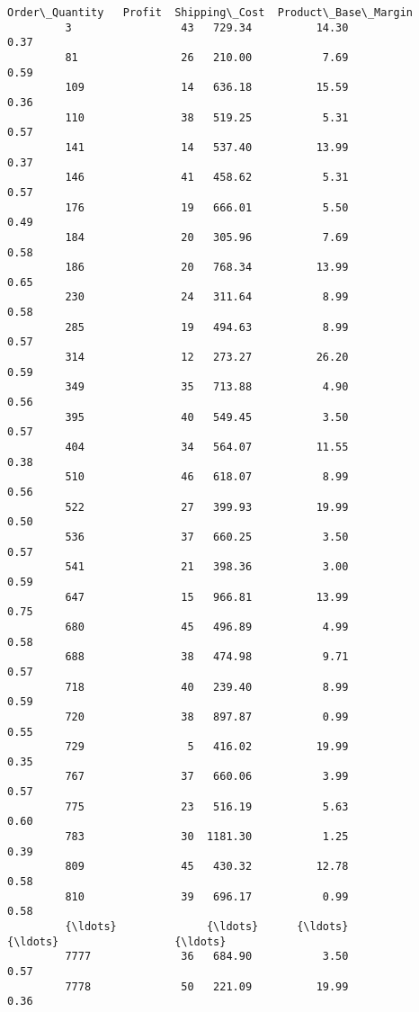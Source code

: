 \documentclass[11pt]{article}
\begin{document}
\begin{Verbatim}[commandchars=\\\{\}]
               Order\_Quantity   Profit  Shipping\_Cost  Product\_Base\_Margin  
         3                 43   729.34          14.30                 0.37  
         81                26   210.00           7.69                 0.59  
         109               14   636.18          15.59                 0.36  
         110               38   519.25           5.31                 0.57  
         141               14   537.40          13.99                 0.37  
         146               41   458.62           5.31                 0.57  
         176               19   666.01           5.50                 0.49  
         184               20   305.96           7.69                 0.58  
         186               20   768.34          13.99                 0.65  
         230               24   311.64           8.99                 0.58  
         285               19   494.63           8.99                 0.57  
         314               12   273.27          26.20                 0.59  
         349               35   713.88           4.90                 0.56  
         395               40   549.45           3.50                 0.57  
         404               34   564.07          11.55                 0.38  
         510               46   618.07           8.99                 0.56  
         522               27   399.93          19.99                 0.50  
         536               37   660.25           3.50                 0.57  
         541               21   398.36           3.00                 0.59  
         647               15   966.81          13.99                 0.75  
         680               45   496.89           4.99                 0.58  
         688               38   474.98           9.71                 0.57  
         718               40   239.40           8.99                 0.59  
         720               38   897.87           0.99                 0.55  
         729                5   416.02          19.99                 0.35  
         767               37   660.06           3.99                 0.57  
         775               23   516.19           5.63                 0.60  
         783               30  1181.30           1.25                 0.39  
         809               45   430.32          12.78                 0.58  
         810               39   696.17           0.99                 0.58  
         {\ldots}              {\ldots}      {\ldots}            {\ldots}                  {\ldots}  
         7777              36   684.90           3.50                 0.57  
         7778              50   221.09          19.99                 0.36  

\end{Verbatim}
\end{document}
